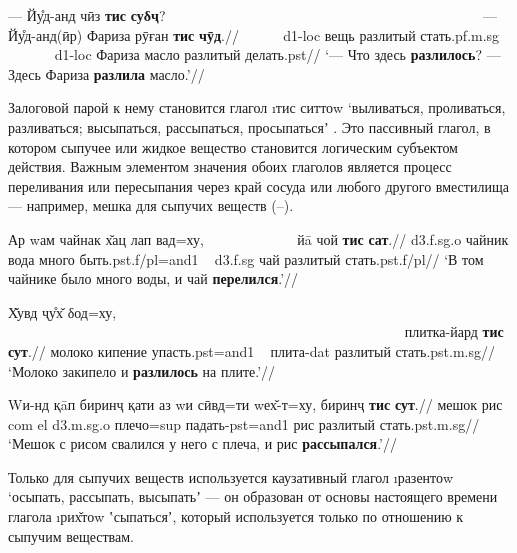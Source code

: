 \begingl
\gla — Йу̊д-анд чӣз \textbf{тис} \textbf{суδҷ}? ~~~~~~~~~~~~~~~~~~~~~~~~~~~~~~~~~~~~~~~~~~~~ — Йу̊д-анд(ӣр) Фариза рӯған \textbf{тис} \textbf{чӯд}.//
\glc ~~~~~ {\sc d1-loc} вещь разлитый стать.{\sc pf.m.sg} ~ ~~~~~~ {\sc d1-loc} Фариза масло разлитый делать.{\sc pst}//
\glft ‘— Что здесь \textbf{разлилось}? — Здесь Фариза \textbf{разлила} масло.’//
\endgl \xe

Залоговой парой к нему становится глагол \i{тис ситтоw} ‘выливаться, проливаться, разливаться; высыпаться, рассыпаться, просыпатьсяʼ \parencite[82]{karamshoev1999}. Это пассивный глагол, в котором сыпучее или жидкое вещество становится логическим субъектом действия. Важным элементом значения обоих глаголов является процесс переливания или пересыпания через край сосуда или любого другого вместилища — например, мешка для сыпучих веществ (–).

\begingl
\gla Ар wам чайнак х̌ац лап вад=ху, ~~~~~~~~~~~~ йā чой \textbf{тис} \textbf{сат}.//
 {\sc d3.f.sg.o} чайник вода много быть.{\sc pst.f/pl=and1} ~ {\sc d3.f.sg} чай разлитый стать.{\sc pst.f/pl}//
\glft ‘В том чайнике было много воды, и чай \textbf{перелился}.’//
\endgl \xe

\begingl
\gla Х̌увд ҷу̊х̌ δод=ху, ~~~~~~~~~~~~~~~~~~~~~~~~~~~~~~~~~~~~~~~~~~~~~~~~~~~~~~~~ плитка-йард \textbf{тис} \textbf{сут}.//
\glc молоко кипение упасть.{\sc pst=and1} ~ плита-{\sc dat} разлитый стать.{\sc pst.m.sg}//
\glft ‘Молоко закипело и \textbf{разлилось} на плите.’//
\endgl \xe

\begingl
\gla Wи-нд қāп биринҷ қати аз wи сӣвд=ти wех̌-т=ху, биринҷ \textbf{тис} \textbf{сут}.//
 мешок рис {\sc com} {\sc el} {\sc d3.m.sg.o} плечо={\sc sup} падать-{\sc pst=and1} рис разлитый стать.{\sc pst.m.sg}//
\glft ‘Мешок с рисом свалился у него с плеча, и рис \textbf{рассыпался}.’//
\endgl \xe

Только для сыпучих веществ используется каузативный глагол \i{разентоw} ‘осыпать, рассыпать, высыпатьʼ \parencite[474]{karamshoev1991} — он образован от основы настоящего времени глагола \i{рих̌тоw} ʽсыпатьсяʼ, который используется только по отношению к сыпучим веществам.


